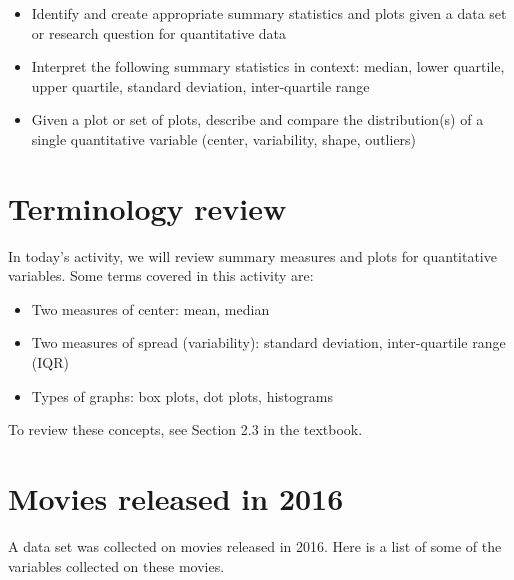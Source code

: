 \documentclass[
]{report}
\begin{document}
\begin{itemize}
\item
  Identify and create appropriate summary statistics and plots
  given a data set or research question for quantitative data
\item
  Interpret the following summary statistics in context:
  median, lower quartile, upper quartile,
  standard deviation, inter-quartile range
\item
  Given a plot or set of plots, describe and compare the distribution(s)
  of a single quantitative variable
  (center, variability, shape, outliers)
\end{itemize}

\hypertarget{terminology-review}{%
\section{Terminology review}\label{terminology-review}}

In today's activity, we will review summary measures and plots for quantitative variables. Some terms covered in this activity are:

\begin{itemize}
\item
  Two measures of center: mean, median
\item
  Two measures of spread (variability): standard deviation, inter-quartile range (IQR)
\item
  Types of graphs: box plots, dot plots, histograms
\end{itemize}

To review these concepts, see Section 2.3 in the textbook.

\hypertarget{movies-released-in-2016}{%
\section{Movies released in 2016}\label{movies-released-in-2016}}

A data set was collected on movies released in 2016. Here is a list of some of the variables collected on these movies.
\end{document}
